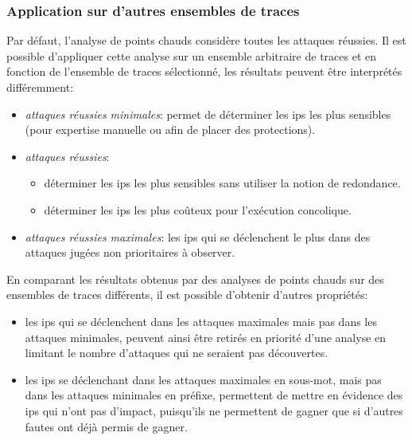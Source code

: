             \subsubsection{Application sur d'autres ensembles de traces}
            \label{sec:hs-redeq}
            
                Par défaut, l'analyse de points chauds considère toutes les attaques réussies. Il est possible d'appliquer cette analyse sur un ensemble arbitraire de traces et en fonction de l'ensemble de traces sélectionné, les résultats peuvent être interprétés différemment:
            
                \begin{itemize}
                    \item \textit{attaques réussies minimales}: permet de déterminer les \gls{ip}s les plus sensibles (pour expertise manuelle ou afin de placer des protections).
                    \item \textit{attaques réussies}: 
                        \begin{itemize}
                            \item déterminer les \gls{ip}s les plus sensibles sans utiliser la notion de redondance.
                            \item déterminer les \gls{ip}s les plus coûteux pour l'exécution concolique.
                        \end{itemize}
                    \item \textit{attaques réussies maximales}: les \gls{ip}s qui se déclenchent le plus dans des attaques jugées non prioritaires à observer. 
                \end{itemize}
                
                En comparant les résultats obtenus par des analyses de points chauds sur des ensembles de traces différents, il est possible d'obtenir d'autres propriétés:
                \begin{itemize}
                    \item les \gls{ip}s qui se déclenchent dans les attaques maximales mais pas dans les attaques minimales, peuvent ainsi être retirés en priorité d'une analyse en limitant le nombre d'attaques qui ne seraient pas découvertes.
                    \item les \gls{ip}s se déclenchant dans les attaques maximales en sous-mot, mais pas dans les attaques minimales en préfixe, permettent de mettre en évidence des \gls{ip}s qui n'ont pas d'impact, puisqu'ils ne permettent de gagner que si d'autres fautes ont déjà permis de gagner.  
                \end{itemize}
                
